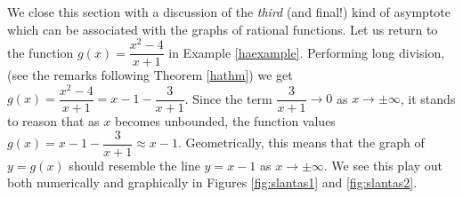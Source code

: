 \medskip

We close this section with a discussion of the \textit{third} (and final!) kind of asymptote which can be associated with the graphs of rational functions. Let us return to the function $g(x) = \dfrac{x^2-4}{x+1}$ in Example \ref{haexample}. Performing long division, (see the remarks following Theorem \ref{hathm}) we get $g(x) = \dfrac{x^2-4}{x+1} = x-1 - \dfrac{3}{x+1}$.  Since the term $\dfrac{3}{x+1} \rightarrow 0$ as $x \rightarrow \pm \infty$, it stands to reason that as $x$ becomes unbounded, the function values   $g(x) = x-1 - \dfrac{3}{x+1} \approx x-1$.  Geometrically, this means that the graph of $y=g(x)$ should resemble the line $y = x-1$ as $x \rightarrow \pm \infty$.  We see this play out both numerically and graphically in Figures \ref{fig:slantas1} and \ref{fig:slantas2}.

  

